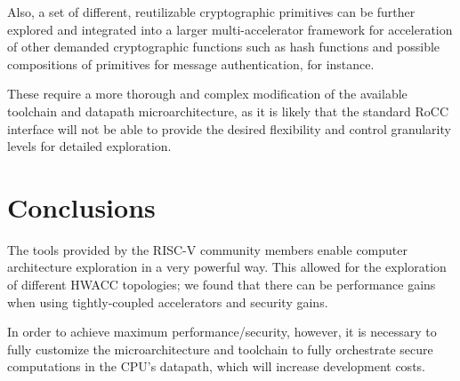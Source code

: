 \documentclass[10pt,conference]{IEEEtran}
\begin{document}
Also, a set of different, reutilizable cryptographic primitives can be further
explored and integrated into a larger multi-accelerator framework for
acceleration of other demanded cryptographic functions such as hash functions
and possible compositions of primitives for message authentication, for instance.

These require a more thorough and complex modification of the available
toolchain and datapath microarchitecture, as it is likely that the standard RoCC
interface will not be able to provide the desired flexibility and control
granularity levels for detailed exploration.

\section{Conclusions}

The tools provided by the RISC-V community members enable computer architecture
exploration in a very powerful way. This allowed for the exploration of
different HWACC topologies; we found that there can be performance gains when
using tightly-coupled accelerators and security gains.

In order to achieve maximum performance/security, however, it is necessary to
fully customize the microarchitecture and toolchain to fully orchestrate secure
computations in the CPU's datapath, which will increase development costs.




\end{document}
